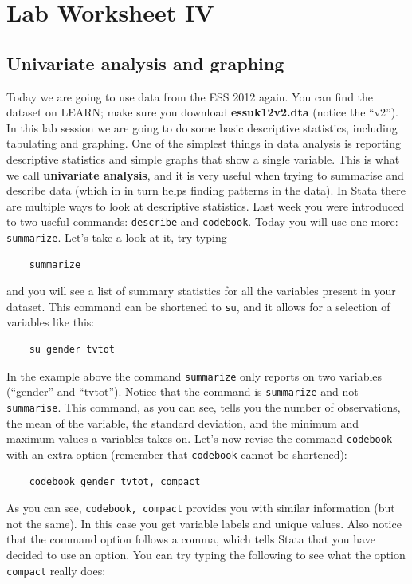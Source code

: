 \documentclass{article}
\begin{document}
\section*{\hfil Lab Worksheet IV \hfil}
\subsection*{Univariate analysis and graphing}

Today we are going to use data from the ESS 2012 again. You can find the dataset on LEARN; make sure you download \textbf{essuk12v2.dta} (notice the ``v2''). In this lab session we are going to do some basic descriptive statistics, including tabulating and graphing. One of the simplest things in data analysis is reporting descriptive statistics and simple graphs that show a single variable. This is what we call \textbf{univariate analysis}, and it is very useful when trying to summarise and describe data (which in in turn helps finding patterns in the data). In Stata there are multiple ways to look at descriptive statistics. Last week you were introduced to two useful commands: \texttt{describe} and \texttt{codebook}. Today you will use one more: \texttt{summarize}. Let’s take a look at it, try typing

\begin{lstlisting}
	summarize
\end{lstlisting} 

and you will see a list of summary statistics for all the variables present in your dataset. This command can be shortened to \texttt{su}, and it allows for a selection of variables like this:

\begin{lstlisting}
	su gender tvtot
\end{lstlisting}

In the example above the command \texttt{summarize} only reports on two variables (``gender'' and ``tvtot''). Notice that the command is \texttt{summarize} and not \texttt{summarise}. This command, as you can see, tells you the number of observations, the mean of the variable, the standard deviation, and the minimum and maximum values a variables takes on. Let's now revise the command \texttt{codebook} with an extra option (remember that \texttt{codebook} cannot be shortened):

\begin{lstlisting}
	codebook gender tvtot, compact
\end{lstlisting}

As you can see, \texttt{codebook, compact} provides you with similar information (but not the same). In this case you get variable labels and unique values. Also notice that the command option follows a comma, which tells Stata that you have decided to use an option. You can try typing the following to see what the option \texttt{compact} really does:
\end{document}
